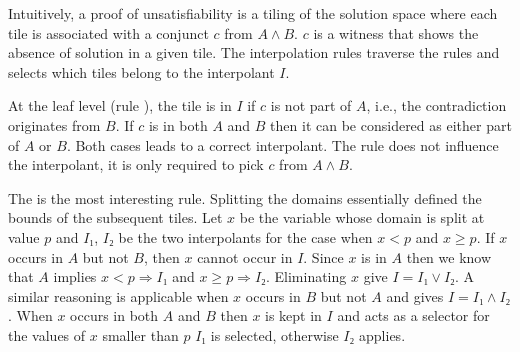 Intuitively, a proof of unsatisfiability is a tiling of the solution space where each tile is associated with a conjunct $c$ from $A ∧ B$.
$c$ is a witness that shows the absence of solution in a given tile.
The interpolation rules traverse the rules and selects which tiles belong to the interpolant $I$.

At the leaf level (rule \thLemI), the tile is in $I$ if $c$ is not part of $A$, i.e., the contradiction originates from $B$.
If $c$ is in both $A$ and $B$ then it can be considered as either part of $A$ or $B$.
Both cases leads to a correct interpolant.
The \weakenI rule does not influence the interpolant, it is only required to pick $c$ from $A ∧ B$.

The \spltI is the most interesting rule.
Splitting the domains essentially defined the bounds of the subsequent tiles.
Let $x$ be the variable whose domain is split at value $p$ and $I₁$, $I₂$ be the two interpolants for the case when $x < p$ and $x ≥ p$.
If $x$ occurs in $A$ but not $B$, then $x$ cannot occur in $I$.
Since $x$ is in $A$ then we know that $A$ implies $x < p ⇒ I₁$ and $x ≥ p ⇒ I₂$.
Eliminating $x$ give $I = I₁ ∨ I₂$.
A similar reasoning is applicable when $x$ occurs in $B$ but not $A$ and gives $I = I₁ ∧ I₂$.
When $x$ occurs in both $A$ and $B$ then $x$ is kept in $I$ and acts as a selector for the values of $x$ smaller than $p$ $I₁$ is selected, otherwise $I₂$ applies.

